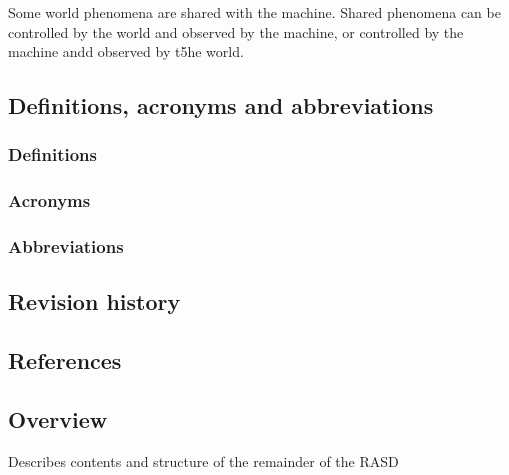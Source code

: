 Some world phenomena are shared with the machine.
Shared phenomena can be controlled by the world and observed by the machine, or controlled by the machine andd observed by t5he world.

\subsection{Definitions, acronyms and abbreviations}
\label{subsect:definitionsacronymsabbreviations}

\subsubsection{Definitions}
\label{subsect:definitions}

\subsubsection{Acronyms}
\label{subsect:acronyms}

\subsubsection{Abbreviations}
\label{subsect:abbreviations}

\subsection{Revision history}
\label{subsect:revisionhistory}

\subsection{References}
\label{subsect:references}

\subsection{Overview}
\label{subsect:overview}

Describes contents and structure of the remainder of the RASD
